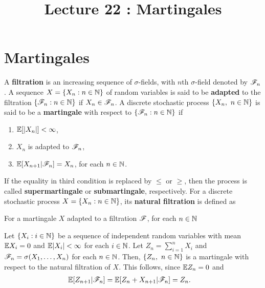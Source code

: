 \documentclass[a4paper,10pt,english]{article}
\title{Lecture 22 : Martingales}
\author{}
\begin{document}
\maketitle
\section{Martingales}
A \textbf{filtration} is an increasing sequence of $\sigma$-fields, with $n$th $\sigma$-field denoted by $\mathscr{F}_n$. 
A sequence $X = \{X_n: n \in \mathbb{N}\}$ of random variables is said to be \textbf{adapted} to the filtration $\{\mathscr{F}_n: n \in \mathbb{N}\}$ if $X_n \in \mathscr{F}_n$. 
A discrete stochastic process $\{X_n,~n \in \mathbb{N} \}$ is said to be a \textbf{martingale} with respect to $\{\mathscr{F}_n: n \in \mathbb{N}\}$ if 
\begin{enumerate}[i\_]
\item $\mathbb{E}[|X_n|]< \infty$,
\item $X_n$ is adapted to $\mathscr{F}_n$,
\item $\mathbb{E}[X_{n+1}|\mathscr{F}_n]=X_n$, for each $n \in \mathbb{N}$.
\end{enumerate}
If the equality in third condition is replaced by $\leq$ or $\geq$, then the process is called \textbf{supermartingale} or \textbf{submartingale}, respectively.
For a discrete stochastic process $X = \{X_n: n \in \mathbb{N}\}$, its \textbf{natural filtration} is defined as 
\begin{cor} For a martingale $X$ adapted to a filtration $\mathscr{F}$, for each $n \in \mathbb{N}$
\end{cor}
\begin{shaded*}
\begin{exmp*}
Let $\{X_i: i \in \mathbb{N}\}$ be a sequence of independent random variables with mean $\mathbb{E} X_i = 0$ and $\mathbb{E}|X_i| < \infty$ for each $i \in \mathbb{N}$. 
Let $Z_n=\sum_{i=1}^n X_i$ and $\mathscr{F}_n = \sigma(X_1, \dots, X_n)$ for each $n \in \mathbb{N}$. 
Then, $\{Z_n,~n \in \mathbb{N} \}$ is a martingale with respect to the natural filtration of $X$.  
This follows, since $\mathbb{E} Z_n=0$ and 
\begin{align*}
\mathbb{E}[Z_{n+1}|\mathscr{F}_n] =\mathbb{E}[Z_{n}+X_{n+1}|\mathscr{F}_n] &=Z_n.
\end{align*} 
\end{exmp*}
\end{shaded*}
\end{document}
